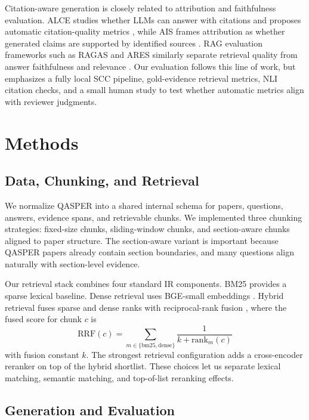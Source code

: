 \documentclass[11pt]{article}
\begin{document}
Citation-aware generation is closely related to attribution and faithfulness evaluation. ALCE studies whether LLMs can answer with citations and proposes automatic citation-quality metrics \citep{gao2023alce}, while AIS frames attribution as whether generated claims are supported by identified sources \citep{rashkin2023ais}. RAG evaluation frameworks such as RAGAS and ARES similarly separate retrieval quality from answer faithfulness and relevance \citep{es2023ragas,saadfalcon2024ares}. Our evaluation follows this line of work, but emphasizes a fully local SCC pipeline, gold-evidence retrieval metrics, NLI citation checks, and a small human study to test whether automatic metrics align with reviewer judgments.

\section{Methods}

\subsection{Data, Chunking, and Retrieval}

We normalize QASPER into a shared internal schema for papers, questions, answers, evidence spans, and retrievable chunks. We implemented three chunking strategies: fixed-size chunks, sliding-window chunks, and section-aware chunks aligned to paper structure. The section-aware variant is important because QASPER papers already contain section boundaries, and many questions align naturally with section-level evidence.

Our retrieval stack combines four standard IR components. BM25 \citep{robertson2009bm25} provides a sparse lexical baseline. Dense retrieval uses BGE-small embeddings \citep{xiao2023bge}. Hybrid retrieval fuses sparse and dense ranks with reciprocal-rank fusion \citep{cormack2009rrf}, where the fused score for chunk $c$ is
\[
\mathrm{RRF}(c)=\sum_{m \in \{\mathrm{bm25},\mathrm{dense}\}} \frac{1}{k+\mathrm{rank}_m(c)}
\]
with fusion constant $k$. The strongest retrieval configuration adds a cross-encoder reranker \citep{nogueira2019bert} on top of the hybrid shortlist. These choices let us separate lexical matching, semantic matching, and top-of-list reranking effects.

\subsection{Generation and Evaluation}
\end{document}
